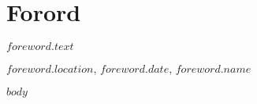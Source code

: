 \documentclass[11pt, a4paper]{article}
\begin{document}
\clearpage
\doublespacing
\tableofcontents
{}
\singlespacing
\clearpage

\section{Forord}

\normalsize
$foreword.text$\par
\medskip
$foreword.location$, $foreword.date$, $foreword.name$



\clearpage
\setcounter{secnumdepth}{4}
\setlength{\parskip}{6pt}

$body$


\end{document}
